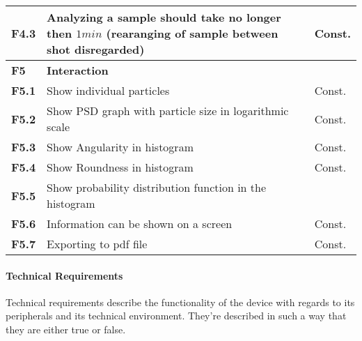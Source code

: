 \documentclass[11pt,fleqn,,a4paper,twoside,openright]{book}
\begin{document}
\begin{longtable}{|p{1cm}| p{10cm} p{1.5cm}|}
\hline 
\textbf{F4.3}\label{F4.3} & Analyzing a sample should take no longer then $ 1 min$ (rearanging of sample between shot disregarded) & Const. \\
\hline 
\textbf{F5}\label{F5} & \textbf{Interaction} &  \\ 
\hline 
\textbf{F5.1}\label{F5.1} & Show individual particles  & Const. \\ 
\hline 
\textbf{F5.2}\label{F5.2} & Show PSD graph with particle size in logarithmic scale  & Const.  \\ 
\hline 
\textbf{F5.3}\label{F5.3} & Show Angularity in histogram  & Const. \\ 
\hline 
\textbf{F5.4}\label{F5.4} & Show Roundness in histogram & Const. \\ 
\hline 
\textbf{F5.5}\label{F5.5} & Show probability distribution function in the histogram &  \\ 
\hline 
\textbf{F5.6}\label{F5.6} & Information can be shown on a screen & Const. \\
\hline 
\textbf{F5.7}\label{F5.7} & Exporting to pdf file & Const. \\
\end{longtable} 

\paragraph{Technical Requirements}
Technical requirements describe the functionality of the device with regards to its peripherals and its technical environment. They're described in such a way that they are either true or false.
\end{document}

